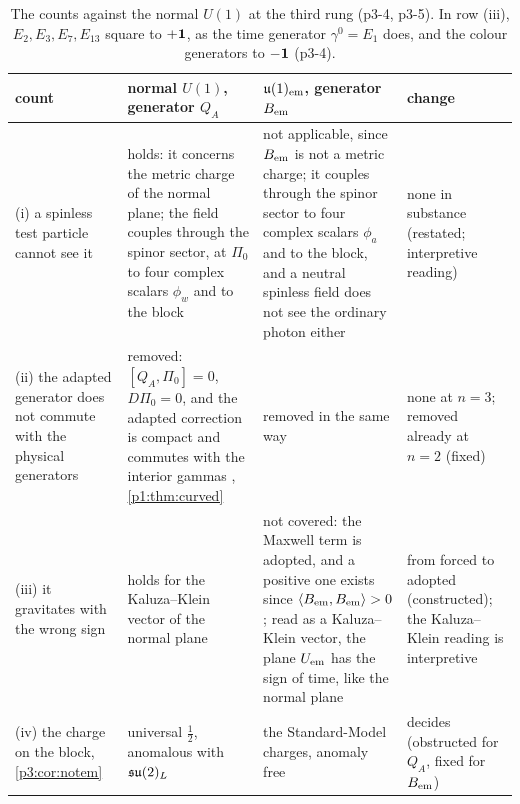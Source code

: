 \begin{table}[t]
\centering
\footnotesize
\begin{tabular}{@{}>{\raggedright\arraybackslash}p{3.1cm}>{\raggedright\arraybackslash}p{4.2cm}>{\raggedright\arraybackslash}p{4.4cm}>{\raggedright\arraybackslash}p{2.6cm}@{}}
\toprule
count & normal $U(1)$, generator $Q_A$ & $\mathfrak{u}(1)_{\rm em}$, generator $B_{\rm em}$ & change\\
\midrule
(i) a spinless test particle cannot see it \cite[Prop.~23.4, Thm.~30.1]{ES17}
& holds: it concerns the metric charge of the normal plane; the field couples through the spinor sector, at $\Pi_0$ to four complex scalars $\phi_w$ and to the block
& not applicable, since $B_{\rm em}$ is not a metric charge; it couples through the spinor sector to four complex scalars $\phi_a$ and to the block, and a neutral spinless field does not see the ordinary photon either
& none in substance (restated; interpretive reading)\\
(ii) the adapted generator does not commute with the physical generators \cite[Section~25]{ES17}
& removed: $[Q_A,\Pi_0]=0$, $D\Pi_0=0$, and the adapted correction is compact and commutes with the interior gammas \cite[Thm.~26.8]{ES17}, \cref{p1:thm:curved}
& removed in the same way
& none at $n=3$; removed already at $n=2$ (fixed)\\
(iii) it gravitates with the wrong sign \cite[Cor.~23.6, Thm.~30.4]{ES17}
& holds for the Kaluza--Klein vector of the normal plane
& not covered: the Maxwell term is adopted, and a positive one exists since $\langle B_{\rm em},B_{\rm em}\rangle>0$; read as a Kaluza--Klein vector, the plane $U_{\rm em}$ has the sign of time, like the normal plane
& from forced to adopted (constructed); the Kaluza--Klein reading is interpretive\\
(iv) the charge on the block, \cref{p3:cor:notem}
& universal $\tfrac12$, anomalous with $\mathfrak{su}(2)_L$
& the Standard-Model charges, anomaly free
& decides (obstructed for $Q_A$, fixed for $B_{\rm em}$)\\
\bottomrule
\end{tabular}
\caption{The counts against the normal $U(1)$ at the third rung (p3-4, p3-5). In row (iii), $E_2,E_3,E_7,E_{13}$ square to $+\mathbf 1$, as the time generator $\gamma^0=E_1$
does, and the colour generators to $-\mathbf 1$ (p3-4).}
\label{p3:tab:counts}
\end{table}

